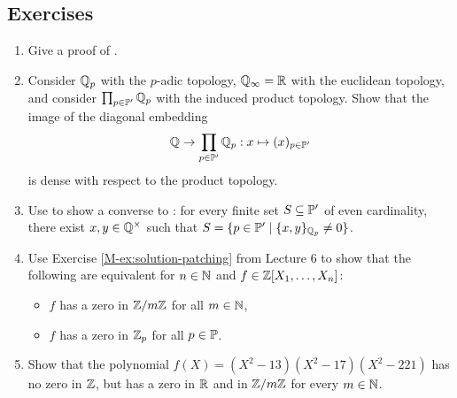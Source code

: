 \documentclass[12pt, leqno, british]{amsart}
\begin{document}
\subsection{Exercises}
\begin{enumerate}
\item Give a proof of .
\item Consider $\mathbb Q_p$ with the $p$-adic topology, $\mathbb Q_{\infty} = \mathbb R$ with the euclidean topology, and consider $\prod_{p \in \mathbb P'} \mathbb Q_p$ with the induced product topology.
Show that the image of the diagonal embedding
$$ \mathbb Q \to \prod_{p \in \mathbb P'} \mathbb Q_p : x \mapsto (x)_{p \in \mathbb P'} $$
is dense with respect to the product topology.
\item Use  to show a converse to : for every finite set $S \subseteq \mathbb P'$ of even cardinality, there exist $x, y \in \mathbb Q^\times$ such that $S = \lbrace p \in \mathbb P' \mid \lbrace x, y \rbrace_{\mathbb Q_p} \neq 0 \rbrace$.
\item\label{ex:solution-modulo-m} Use Exercise \eqref{M-ex:solution-patching} from Lecture 6 to show that the following are equivalent for $n \in \mathbb N$ and $f \in \mathbb Z[X_1, \ldots, X_n]$:
\begin{itemize}
\item $f$ has a zero in $\mathbb Z/m\mathbb Z$ for all $m \in \mathbb N$,
\item $f$ has a zero in $\mathbb Z_p$ for all $p \in \mathbb P$.
\end{itemize}
\item Show that the polynomial $f(X) = (X^2 - 13)(X^2 - 17)(X^2 - 221)$ has no zero in $\mathbb Z$, but has a zero in $\mathbb R$ and in $\mathbb Z/m\mathbb Z$ for every $m \in \mathbb N$.
\end{enumerate}
\end{document}
